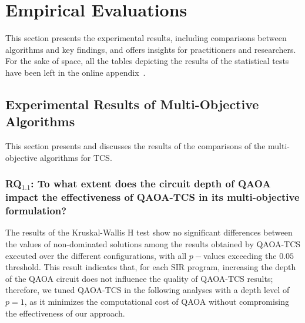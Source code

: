 \section{Empirical Evaluations}
\label{sec:results}
This section presents the experimental results, including comparisons between algorithms and key findings, and offers insights for practitioners and researchers. For the sake of space, all the tables depicting the results of the statistical tests have been left in the online appendix~\citep{appendix}.

\subsection{Experimental Results of Multi-Objective Algorithms}
This section presents and discusses the results of the comparisons of the multi-objective algorithms for TCS.

\subsubsection{RQ$_{1.1}$: To what extent does the circuit depth of QAOA impact the effectiveness of QAOA-TCS in its multi-objective formulation?}
The results of the Kruskal-Wallis H test show no significant differences between the values of non-dominated solutions among the results obtained by \textsc{QAOA-TCS} executed over the different configurations, with all $p-$values exceeding the $0.05$ threshold. This result indicates that, for each SIR program, increasing the depth of the QAOA circuit does not influence the quality of \textsc{QAOA-TCS} results; therefore, we tuned \textsc{QAOA-TCS} in the following analyses with a depth level of $p=1$, as it minimizes the computational cost of QAOA without compromising the effectiveness of our approach.

